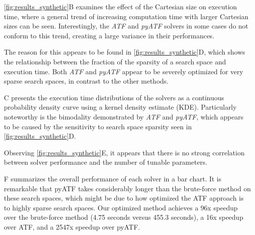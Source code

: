 \cref{fig:results_synthetic}B examines the effect of the Cartesian size on execution time, where a general trend of increasing computation time with larger Cartesian sizes can be seen. Interestingly, the \textit{ATF} and \textit{pyATF} solvers in some cases do not conform to this trend, creating a large variance in their performances.

The reason for this appears to be found in \cref{fig:results_synthetic}D, which shows the relationship between the fraction of the sparsity of a search space and execution time. Both \textit{ATF} and \textit{pyATF} appear to be severely optimized for very sparse search spaces, in contrast to the other methods. 

C presents the execution time distributions of the solvers as a continuous probability density curve using a kernel density estimate (KDE). Particularly noteworthy is the bimodality demonstrated by \textit{ATF} and \textit{pyATF}, which appears to be caused by the sensitivity to search space sparsity seen in \cref{fig:results_synthetic}D.

Observing \cref{fig:results_synthetic}E, it appears that there is no strong correlation between solver performance and the number of tunable parameters. 

F summarizes the overall performance of each solver in a bar chart.
It is remarkable that pyATF takes considerably longer than the brute-force method on these search spaces, which might be due to how optimized the ATF approach is to highly sparse search spaces.
Our optimized method achieves a 96x speedup over the brute-force method (4.75 seconds versus 455.3 seconds), a 16x speedup over ATF, and a 2547x speedup over pyATF. 

